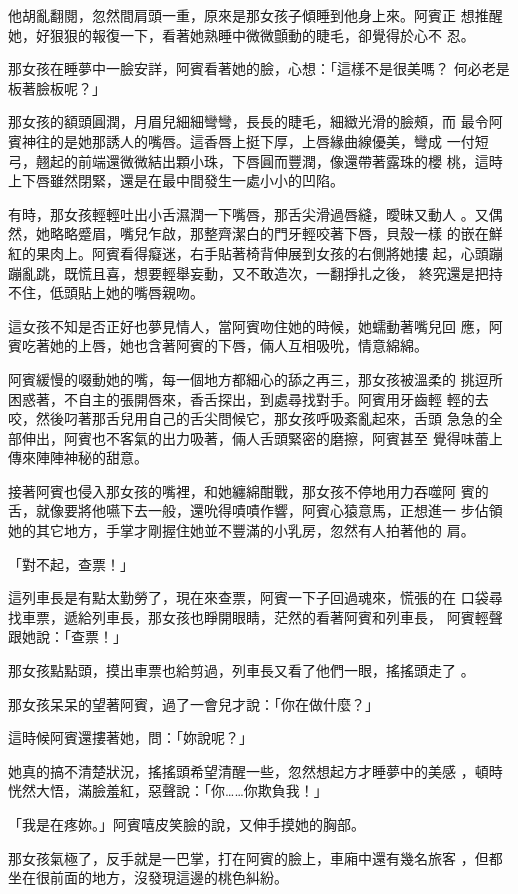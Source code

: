 他胡亂翻閱，忽然間肩頭一重，原來是那女孩子傾睡到他身上來。阿賓正
想推醒她，好狠狠的報復一下，看著她熟睡中微微顫動的睫毛，卻覺得於心不
忍。

那女孩在睡夢中一臉安詳，阿賓看著她的臉，心想：「這樣不是很美嗎？
何必老是板著臉板呢？」

那女孩的額頭圓潤，月眉兒細細彎彎，長長的睫毛，細緻光滑的臉頰，而
最令阿賓神往的是她那誘人的嘴唇。這香唇上挺下厚，上唇緣曲線優美，彎成
一付短弓，翹起的前端還微微結出顆小珠，下唇圓而豐潤，像還帶著露珠的櫻
桃，這時上下唇雖然閉緊，還是在最中間發生一處小小的凹陷。

有時，那女孩輕輕吐出小舌濕潤一下嘴唇，那舌尖滑過唇縫，曖昧又動人
。又偶然，她略略蹙眉，嘴兒乍啟，那整齊潔白的門牙輕咬著下唇，貝殼一樣
的嵌在鮮紅的果肉上。阿賓看得癡迷，右手貼著椅背伸展到女孩的右側將她摟
起，心頭蹦蹦亂跳，既慌且喜，想要輕舉妄動，又不敢造次，一翻掙扎之後，
終究還是把持不住，低頭貼上她的嘴唇親吻。

這女孩不知是否正好也夢見情人，當阿賓吻住她的時候，她蠕動著嘴兒回
應，阿賓吃著她的上唇，她也含著阿賓的下唇，倆人互相吸吮，情意綿綿。

阿賓緩慢的啜動她的嘴，每一個地方都細心的舔之再三，那女孩被溫柔的
挑逗所困惑著，不自主的張開唇來，香舌探出，到處尋找對手。阿賓用牙齒輕
輕的去咬，然後叼著那舌兒用自己的舌尖問候它，那女孩呼吸紊亂起來，舌頭
急急的全部伸出，阿賓也不客氣的出力吸著，倆人舌頭緊密的磨擦，阿賓甚至
覺得味蕾上傳來陣陣神秘的甜意。

接著阿賓也侵入那女孩的嘴裡，和她纏綿酣戰，那女孩不停地用力吞噬阿
賓的舌，就像要將他嚥下去一般，還吮得嘖嘖作響，阿賓心猿意馬，正想進一
步佔領她的其它地方，手掌才剛握住她並不豐滿的小乳房，忽然有人拍著他的
肩。

「對不起，查票！」

這列車長是有點太勤勞了，現在來查票，阿賓一下子回過魂來，慌張的在
口袋尋找車票，遞給列車長，那女孩也睜開眼睛，茫然的看著阿賓和列車長，
阿賓輕聲跟她說：「查票！」

那女孩點點頭，摸出車票也給剪過，列車長又看了他們一眼，搖搖頭走了
。

那女孩呆呆的望著阿賓，過了一會兒才說：「你在做什麼？」

這時候阿賓還摟著她，問：「妳說呢？」

她真的搞不清楚狀況，搖搖頭希望清醒一些，忽然想起方才睡夢中的美感
，頓時恍然大悟，滿臉羞紅，惡聲說：「你……你欺負我！」

「我是在疼妳。」阿賓嘻皮笑臉的說，又伸手摸她的胸部。

那女孩氣極了，反手就是一巴掌，打在阿賓的臉上，車廂中還有幾名旅客
，但都坐在很前面的地方，沒發現這邊的桃色糾紛。

